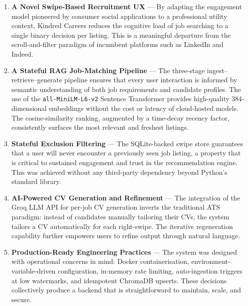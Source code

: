 \documentclass[12pt, a4paper, oneside]{report}
\begin{document}
\begin{enumerate}[leftmargin=*, itemsep=6pt]
  \item \textbf{A Novel Swipe-Based Recruitment UX} — By adapting the engagement model
        pioneered by consumer social applications to a professional utility context, Kindred
        Careers reduces the cognitive load of job searching to a single binary decision per
        listing. This is a meaningful departure from the scroll-and-filter paradigm of
        incumbent platforms such as LinkedIn and Indeed.

  \item \textbf{A Stateful RAG Job-Matching Pipeline} — The three-stage
        ingest–retrieve–generate pipeline ensures that every user interaction is informed
        by semantic understanding of both job requirements and candidate profiles. The use of
        the \texttt{all-MiniLM-L6-v2} Sentence Transformer provides high-quality 384-dimensional
        embeddings without the cost or latency of cloud-hosted models. The
        cosine-similarity ranking, augmented by a time-decay recency factor, consistently
        surfaces the most relevant and freshest listings.

  \item \textbf{Stateful Exclusion Filtering} — The SQLite-backed swipe store guarantees
        that a user will never encounter a previously seen job listing, a property that is
        critical to sustained engagement and trust in the recommendation engine. This was
        achieved without any third-party dependency beyond Python's standard library.

  \item \textbf{AI-Powered CV Generation and Refinement} — The integration of the Groq LLM
        API for per-job CV generation inverts the traditional ATS paradigm: instead of
        candidates manually tailoring their CVs, the system tailors a CV automatically for
        each right-swipe. The iterative regeneration capability further empowers users to
        refine output through natural language.

  \item \textbf{Production-Ready Engineering Practices} — The system was designed with
        operational concerns in mind: Docker containerisation, environment-variable-driven
        configuration, in-memory rate limiting, auto-ingestion triggers at low watermarks,
        and idempotent ChromaDB upserts. These decisions collectively produce a backend
        that is straightforward to maintain, scale, and secure.
\end{enumerate}
\end{document}
